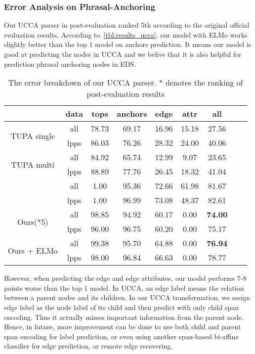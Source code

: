 \subsubsection{Error Analysis on Phrasal-Anchoring}
\label{sssec:lex-phr:error-phr}
Our UCCA parser in post-evaluation ranked 5th according to the
original official evaluation results. According
to~\autoref{tbl:results_ucca}, our model with ELMo works slightly
better than the top 1 model on anchors prediction. It means our model
is good at predicting the nodes in UCCA and we belive that it is also
helpful for prediction phrasal anchoring nodes in EDS.

\begin{table}[!h]
  \caption{\label{tbl:results_ucca} The error breakdown of our UCCA
    parser. * denotes the ranking of post-evaluation results }
\small
\centering
\setlength{\tabcolsep}{2.5pt}

\begin{tabular}{ccccccccc}
\toprule
                              & data & tops  & anchors & edge  & attr  & all   \\ \hline
\multirow{2}{*}{ TUPA
single }                      & all  & 78.73 & 69.17   & 16.96 & 15.18 & 27.56 \\
                              & lpps & 86.03 & 76.26   & 28.32 & 24.00 & 40.06 \\
\multirow{2}{*}{ TUPA
multi }                       & all  & 84.92 & 65.74   & 12.99 &  9.07 & 23.65 \\
                              & lpps & 88.89 & 77.76   & 26.45 & 18.32 & 41.04 \\
\multirow{2}{*}{\cite{Che:Dou:Xu:19}}       & all  & 1.00  & 95.36   & 72.66 & 61.98 & 81.67 \\
                              & lpps & 1.00  & 96.99   & 73.08 & 48.37 & 82.61 \\ \hline
\multirow{2}{*}{ Ours(*5)}    & all  & 98.85 & 94.92   & 60.17 & 0.00  & {\bf 74.00} \\
                              & lpps & 96.00 & 96.75   & 60.20 & 0.00  & 75.17 \\
\multirow{2}{*}{ Ours + ELMo} & all  & 99.38 & 95.70   & 64.88 & 0.00  & {\bf 76.94} \\
                              & lpps & 98.00 & 96.84   & 66.63 & 0.00  & 78.77 \\ \bottomrule
\end{tabular}
\end{table}

However, when predicting the edge and edge attributes, our model
performs 7-8 points worse than the top 1 model. In UCCA, an edge label
means the relation between a parent nodes and its children. In our
UCCA transformation, we assign edge label as the node label of its
child and then predict with only child span encoding. Thus it actually
misses important information from the parent node. Hence, in future,
more improvement can be done to use both child and parent span
encoding for label prediction, or even using another span-based
bi-affine classifier for edge prediction, or remote edge recovering.


